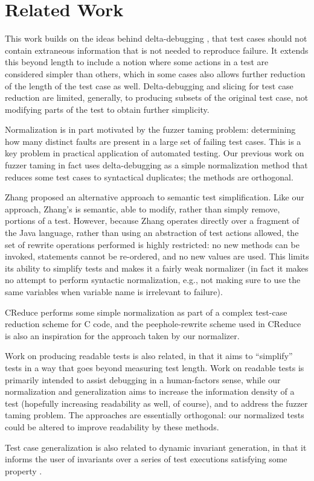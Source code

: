 \section{Related Work}

This work builds on the ideas behind delta-debugging \cite{DD}, that test cases
should not contain extraneous information that is not needed to
reproduce failure.  It extends this beyond length to include a notion
where some actions in a test are considered simpler than others, which
in some cases also allows further reduction of the length of the test
case as well.  Delta-debugging and slicing \cite{TCminim} for test case
reduction are limited, generally, to producing subsets of the original
test case, not modifying parts of the test to obtain further
simplicity.

Normalization is in part motivated by the fuzzer taming \cite{PLDI13}
problem:  determining how many distinct faults are present in a large
set of failing test cases.  This is a key problem in practical
application of automated testing.  Our previous work on fuzzer taming
in fact uses delta-debugging as a simple normalization method that
reduces some test cases to syntactical duplicates; the methods are orthogonal.

Zhang \cite{SaiSimple} proposed an alternative approach to semantic
test simplification.  Like our approach, Zhang's is semantic, able to
modify, rather than simply remove, portions of a test.  However,
because Zhang operates directly over a fragment of the Java language,
rather than using an abstraction of test actions allowed, the set of
rewrite operations performed is highly restricted:  no new methods can
be invoked, statements cannot be re-ordered, and no new values are
used.  This limits its ability to simplify tests and makes it a fairly
weak normalizer (in fact it makes no attempt to perform syntactic
normalization, e.g., not making sure to use the same variables when
variable name is irrelevant to failure).

CReduce \cite{CReduce} performs some simple normalization as part of a
complex test-case reduction scheme for C code, and the
peephole-rewrite scheme used in CReduce is also an inspiration for the
approach taken by our normalizer.

Work on producing readable tests \cite{Guava,Readable} is also
related, in that it aims to ``simplify'' tests in a way that goes
beyond measuring test length.  Work on readable tests is primarily
intended to assist debugging in a human-factors sense, while our
normalization and generalization aims to increase the information
density of a test (hopefully increasing readability as well, of
course), and to address the fuzzer taming problem.  The approaches are
essentially orthogonal: our normalized tests could be altered to
improve readability by these methods.

Test case generalization is also related to dynamic invariant
generation, in that it informs the user of invariants over a series of
test executions satisfying some property \cite{Daikon}. 